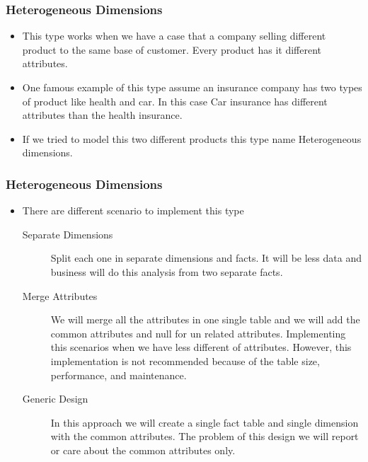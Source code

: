%
\textbf{}
\VideoClassification[column=1, colour=blue]
\begin{frame}
\frametitle{Heterogeneous Dimensions}
\begin{itemize}[<+->]
	
	\item This type works when we have a case that a company selling different product to the same base of customer. Every product has it different attributes. 
	\item One famous example of this type assume an insurance company has two types of product like health and car. In this case Car insurance has different attributes than the health insurance.
	\item If we tried to model this two different products this type name Heterogeneous dimensions. 
\end{itemize}
\end{frame}
\begin{frame}
	\frametitle{Heterogeneous Dimensions}
	\begin{itemize}[<+->]		
		\item There are different scenario to implement this type
		\begin{description}
			\item [Separate Dimensions] Split each one in separate dimensions and facts. It will be less data and business will do this analysis from two separate facts.
			\item [Merge Attributes] We will merge all the attributes in one single table and we will add the common attributes and null for un related attributes. Implementing this scenarios when we have less different of attributes. However, this implementation is not recommended because of the table size, performance, and maintenance.
			\item [Generic Design] In this approach we will create a single fact table and single dimension with the common attributes. The problem of this design we will report or care about the common attributes only.
		\end{description}		
\end{itemize}
\end{frame}
